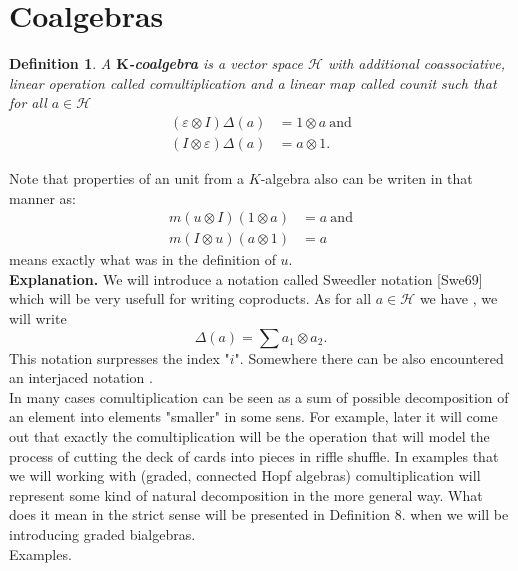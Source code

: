 \documentclass[a4paper, 12pt]{report}
\newtheorem{definition}{Definition}
\begin{document}
\section{Coalgebras}
\begin{definition}
A \textbf{$\textbf{K}$-coalgebra} is a vector space $\mathcal{H}$
with additional coassociative, linear operation
 called comultiplication and
a linear map  called counit such that for all
$a \in \mathcal{H}$
\begin{align*}
(\varepsilon \otimes I)\Delta(a) &= 1 \otimes a \mathrm{\ and} \\
(I \otimes \varepsilon)\Delta(a) &= a \otimes 1.
\end{align*}
\end{definition}
Note that properties of an unit from a $K$-algebra also can be writen in that manner as:
\begin{align*}
m(u \otimes I)(1 \otimes a) &= a \mathrm{\ and}\\
m(I \otimes u)(a \otimes 1) &= a
\end{align*}
means exactly what was in the definition of $u$. \\[8pt]
\textbf{Explanation.} We will introduce a notation called Sweedler notation [Swe69] which will be
very usefull
for writing coproducts. As for all $a \in \mathcal{H}$ we have
, we will write
\begin{equation*}
\Delta(a) = \displaystyle\sum a_1 \otimes a_2.
\end{equation*}
This notation surpresses the index "$i$". Somewhere there can be also encountered an interjaced
notation . \\
In many cases comultiplication can be seen as a sum of possible decomposition of an element into
elements "smaller" in some sens.
For example, later it will come out that exactly the comultiplication will be the operation that will
model the process of cutting the deck of cards into pieces in riffle shuffle. In examples that we will 
working with (graded, connected Hopf algebras) comultiplication will represent some kind of natural 
decomposition in the more general way. What does it mean in the strict sense will be presented in 
Definition 8. when we will be introducing graded bialgebras. \\
Examples. \\[8pt]
\end{document}
